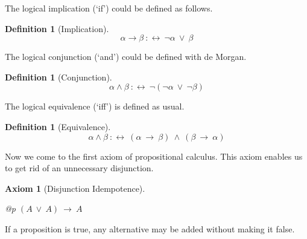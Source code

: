 \documentclass[a4paper,german,10pt,twoside]{book}
\newtheorem{ax}{Axiom}
\theoremstyle{definition}
\newtheorem{defn}[thm]{Definition}
\theoremstyle{remark}
\begin{document}
\par
The logical implication (`if') could be defined as follows.

\begin{defn}[Implication]
\label{definition:implication} \hypertarget{definition:implication}{}
$$\alpha \rightarrow \beta\ :\leftrightarrow \ \neg \alpha\ \lor \ \beta$$

\end{defn}




\par
The logical conjunction (`and') could be defined with de Morgan.

\begin{defn}[Conjunction]
\label{definition:conjunction} \hypertarget{definition:conjunction}{}
$$\alpha \land \beta\ :\leftrightarrow \ \neg (\neg \alpha\ \lor \ \neg \beta)$$

\end{defn}




\par
The logical equivalence (`iff') is defined as usual.

\begin{defn}[Equivalence]
\label{definition:equivalence} \hypertarget{definition:equivalence}{}
$$\alpha \land \beta\ :\leftrightarrow \ (\alpha\ \rightarrow \ \beta)\ \land \ (\beta\ \rightarrow \ \alpha)$$

\end{defn}




\par
Now we come to the first axiom of propositional calculus. This axiom 
enables us to get rid of an unnecessary disjunction.

\begin{ax}[Disjunction Idempotence]
\label{axiom:disjunction_idempotence} \hypertarget{axiom:disjunction_idempotence}{}
\mbox{}
\begin{longtable}{{@{\extracolsep{\fill}}p{\linewidth}}}
\centering $(A\ \lor \ A)\ \rightarrow \ A$
\end{longtable}

\end{ax}




\par
If a proposition is true, any alternative may be added without making it false.
\end{document}
